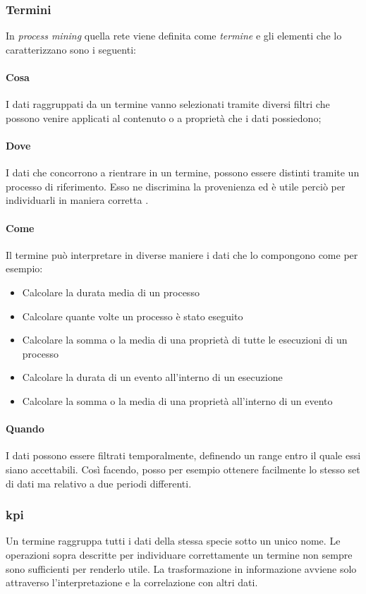 \subsubsection{Termini}
In \textit{process mining} quella rete viene definita come \emph{termine} e gli elementi che lo caratterizzano sono i seguenti:
\paragraph{Cosa}
I dati raggruppati da un termine vanno selezionati tramite diversi filtri che possono venire applicati al contenuto o a proprietà che i dati possiedono;

\paragraph{Dove}
I dati che concorrono a rientrare in un termine, possono essere distinti tramite un processo di riferimento. Esso ne discrimina la provenienza ed è utile perciò per individuarli in maniera corretta .
\newpage

\paragraph{Come}
Il termine può interpretare in diverse maniere i dati che lo compongono come per esempio:
\begin{itemize}
    \item Calcolare la durata media di un processo
    \item Calcolare quante volte un processo è stato eseguito
    \item Calcolare la somma o la media di una proprietà di tutte le esecuzioni di un processo
    \item Calcolare la durata di un evento all'interno di un esecuzione
    \item Calcolare la somma o la media di una proprietà all'interno di un evento
\end{itemize}

\paragraph{Quando}
I dati possono essere filtrati temporalmente, definendo un range entro il quale essi siano accettabili. Così facendo, posso per esempio ottenere facilmente lo stesso set di dati ma relativo a due periodi differenti.
\subsubsection{\acrfull{kpi}}
Un termine raggruppa tutti i dati della stessa specie sotto un unico nome.
Le operazioni sopra descritte per individuare correttamente un termine non sempre sono sufficienti per renderlo utile. La trasformazione in informazione avviene solo attraverso l'interpretazione e la correlazione con altri dati.

